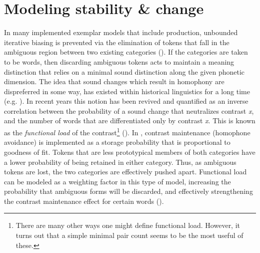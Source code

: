 \chapter{Modeling stability \& change}\label{ch:Models-of-Change}

In many implemented exemplar models that include production, unbounded
iterative biasing is prevented via the elimination of tokens that
fall in the ambiguous region between two existing categories (\citealt{Wedel2004,Wedel2006,Wedel2008,Blevins2009,DBLP:journals/corr/Tupper14a}).
If the categories are taken to be words, then discarding ambiguous
tokens acts to maintain a meaning distinction that relies on a minimal
sound distinction along the given phonetic dimension. The idea that
sound changes which result in homophony are dispreferred in some way, 
has existed within historical linguistics for a long time (e.g. \citealt{Martinet1955}).
In recent years this notion has been revived and quantified as an
inverse correlation between the probability of a sound change that
neutralizes contrast \emph{x}, and the number of words that are differentiated
only by contrast \emph{x}. This is known as the \emph{functional load}
of the contrast\footnote{There are many other ways one might define functional load. However,
it turns out that a simple minimal pair count seems to be the most
useful of these.} (\citealp{Surendran2006,wedel2013high}). In \citet{Wedel2008},
contrast maintenance (homophone avoidance) is implemented as a storage
probability that is proportional to goodness of fit. Tokens that are
less prototypical members of both categories have a lower probability
of being retained in either category. Thus, as ambiguous tokens are
lost, the two categories are effectively pushed apart. Functional
load can be modeled as a weighting factor in this type of model, increasing
the probability that ambiguous forms will be discarded, and effectively
strengthening the contrast maintenance effect for certain words (\citealt{Soskuthy2015}).

